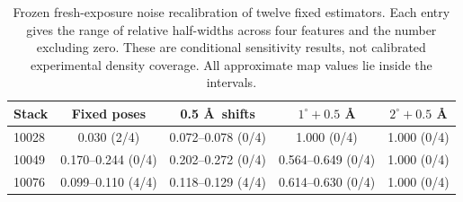 \begin{table}[t]
\centering\small
\caption{Frozen fresh-exposure noise recalibration of twelve fixed estimators. Each entry gives the range of relative half-widths across four features and the number excluding zero. These are conditional sensitivity results, not calibrated experimental density coverage. All approximate map values lie inside the intervals.}
\label{tab:fresh-targets}
\begin{tabular}{lcccc}
\toprule
Stack & Fixed poses & 0.5 \AA\ shifts & $1^\circ+0.5$ \AA & $2^\circ+0.5$ \AA \\
\midrule
10028 & 0.030 (2/4) & 0.072--0.078 (0/4) & 1.000 (0/4) & 1.000 (0/4) \\
10049 & 0.170--0.244 (0/4) & 0.202--0.272 (0/4) & 0.564--0.649 (0/4) & 1.000 (0/4) \\
10076 & 0.099--0.110 (4/4) & 0.118--0.129 (4/4) & 0.614--0.630 (0/4) & 1.000 (0/4) \\
\bottomrule
\end{tabular}
\end{table}
